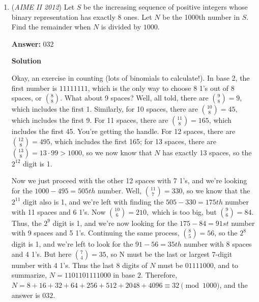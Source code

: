 \begin{enumerate}
 Notice that $\cos\theta_{2}=\frac{1}{\sqrt{5}}$ and $\sin\theta_{2}=\frac{2}{\sqrt{5}}$

 Then, we have that $\cos{2\theta_{2}}=\cos^2{\theta_{2}}-\sin^2{\theta_{2}}=-\frac{3}{5}$ and $\sin{2\theta_{2}}=2\sin{\theta_{2}}\cos{\theta_{2}}=\frac{4}{5}$

 Finally, plugging back in, we find that $z_{1}^4=625(-\frac{3}{5}+\frac{4i}{5})=-375+500i$
$-375+500=\boxed{125}$




\textbf{Solution 3}

Clearly, we want $\arg((1+2i)z^3) = \pi + \arg(z^5)$. This is equivalent to $\arg(1+2i) = \pi + 2 \arg(z)$ by the additive property of the argument in complex multiplication. Because we want to find $z^4$, we want an expression for $\arg(z^4)$. We now have $2\arg(1+2i) = 2\pi + 4 \arg(z) \rightarrow \arg(-3+4i) = 4\arg(z)$. Thus, $z^4$ is in the direction of $-3 + 4i$. To achieve a magnitude of 5\textasciicircum{}4, we need to multiple $-3+4i$ by 125, so $z^4 = 125(-3+4i)$ and the answer is thus $\boxed{125}$.

 


	\item (\textit{AIME II 2012}) Let $S$ be the increasing sequence of positive integers whose binary representation has exactly $8$ ones. Let $N$ be the 1000th number in $S$. Find the remainder when $N$ is divided by $1000$.


 
 \textbf{Answer: }032



\textbf{Solution}

Okay, an exercise in counting (lots of binomials to calculate!).  In base 2, the first number is $11111111$, which is the only way to choose 8 1's out of 8 spaces, or $\binom{8}{8}$.  What about 9 spaces?  Well, all told, there are $\binom{9}{8}=9$, which includes the first 1.  Similarly, for 10 spaces, there are $\binom{10}{8}=45,$ which includes the first 9.  For 11 spaces, there are $\binom{11}{8}=165$, which includes the first 45.  You're getting the handle.  For 12 spaces, there are $\binom{12}{8}=495$, which includes the first 165; for 13 spaces, there are $\binom{13}{8}=13 \cdot 99 > 1000$, so we now know that $N$ has exactly 13 spaces, so the $2^{12}$ digit is 1.  

 Now we just proceed with the other 12 spaces with 7 1's, and we're looking for the $1000-495=505th$ number.  Well, $\binom{11}{7}=330$, so we know that the $2^{11}$ digit also is 1, and we're left with finding the $505-330=175th$ number with 11 spaces and 6 1's.  Now $\binom{10}{6}=210,$ which is too big, but $\binom{9}{6}=84.$  Thus, the $2^9$ digit is 1, and we're now looking for the $175-84=91st$ number with 9 spaces and 5 1's.  Continuing the same process, $\binom{8}{5}=56$, so the $2^8$ digit is 1, and we're left to look for the $91-56=35th$ number with 8 spaces and 4 1's.  But here $\binom{7}{4}=35$, so N must be the last or largest 7-digit number with 4 1's.  Thus the last 8 digits of $N$ must be $01111000$, and to summarize, $N=1101101111000$ in base $2$.  Therefore, $N = 8+16+32+64+256+512+2048+4096 \equiv 32 \pmod{1000}$, and the answer is $\boxed{032}$.


\end{enumerate}
